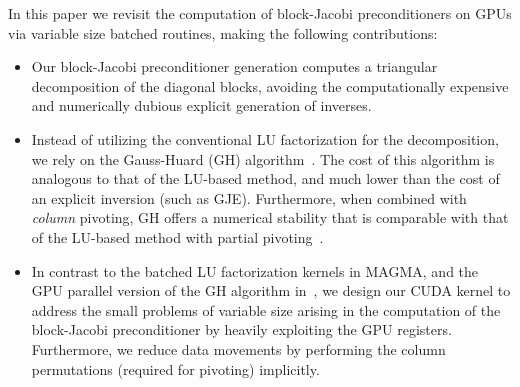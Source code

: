 In this paper we revisit the computation of block-Jacobi preconditioners on GPUs via variable size batched routines, 
making the following contributions:
\begin{itemize}
\setlength\itemsep{0em}
\item Our block-Jacobi preconditioner generation computes a triangular decomposition of the diagonal blocks, 
      avoiding the computationally expensive and numerically dubious explicit generation of inverses.
\item Instead of utilizing the conventional LU factorization for the decomposition, we
      rely on the Gauss-Huard (GH) algorithm~\cite{Hua79}.
      The cost of this algorithm is
      analogous to that of the LU-based method, and
      much lower than the cost of an explicit inversion (such as GJE).
      Furthermore, 
      when combined with {\em column} pivoting, GH offers a numerical stability that is comparable with that of the LU-based method
      with partial pivoting~\cite{Dek97}.
\item In contrast to the batched LU factorization kernels in MAGMA, and the GPU parallel version of
      the GH algorithm in~\cite{Benner2016}, we design our CUDA kernel to address the small problems of variable size
      arising in the computation of the block-Jacobi preconditioner by heavily exploiting the GPU registers. Furthermore,
      we reduce data movements
      by performing the column permutations (required for pivoting) implicitly.
\end{itemize}
